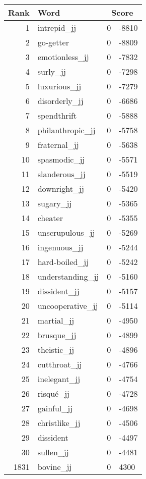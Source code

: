 \begin{longtable}[!htbp]{| rlr@{.}l |}
    \hline
    \textbf{Rank} & \textbf{Word} & \multicolumn{2}{c|}{\textbf{Score}} \\
    \hline
    \endhead
    1 & intrepid\_jj & 0 & -8810 \\
    2 & go-getter & 0 & -8809 \\
    3 & emotionless\_jj & 0 & -7832 \\
    4 & surly\_jj & 0 & -7298 \\
    5 & luxurious\_jj & 0 & -7279 \\
    6 & disorderly\_jj & 0 & -6686 \\
    7 & spendthrift & 0 & -5888 \\
    8 & philanthropic\_jj & 0 & -5758 \\
    9 & fraternal\_jj & 0 & -5638 \\
    10 & spasmodic\_jj & 0 & -5571 \\
    11 & slanderous\_jj & 0 & -5519 \\
    12 & downright\_jj & 0 & -5420 \\
    13 & sugary\_jj & 0 & -5365 \\
    14 & cheater & 0 & -5355 \\
    15 & unscrupulous\_jj & 0 & -5269 \\
    16 & ingenuous\_jj & 0 & -5244 \\
    17 & hard-boiled\_jj & 0 & -5242 \\
    18 & understanding\_jj & 0 & -5160 \\
    19 & dissident\_jj & 0 & -5157 \\
    20 & uncooperative\_jj & 0 & -5114 \\
    21 & martial\_jj & 0 & -4950 \\
    22 & brusque\_jj & 0 & -4899 \\
    23 & theistic\_jj & 0 & -4896 \\
    24 & cutthroat\_jj & 0 & -4766 \\
    25 & inelegant\_jj & 0 & -4754 \\
    26 & risqué\_jj & 0 & -4728 \\
    27 & gainful\_jj & 0 & -4698 \\
    28 & christlike\_jj & 0 & -4506 \\
    29 & dissident & 0 & -4497 \\
    30 & sullen\_jj & 0 & -4481 \\
    1831 & bovine\_jj & 0 & 4300 \\

\end{longtable}
